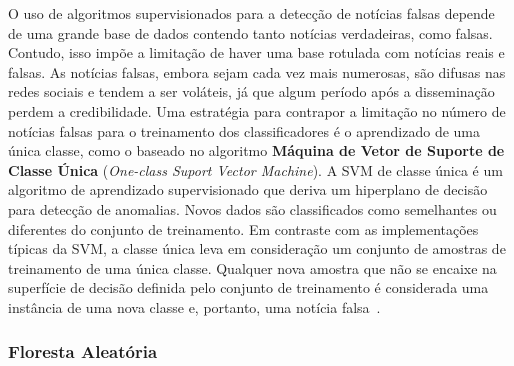 \documentclass{SBCbookchapter}
\begin{document}
O uso de algoritmos supervisionados para a detecção de notícias falsas depende de uma grande base de dados contendo tanto notícias verdadeiras, como falsas. Contudo, isso impõe a limitação de haver uma base rotulada com notícias reais e falsas. As notícias falsas, embora sejam cada vez mais numerosas, são difusas nas redes sociais e tendem a ser voláteis, já que algum período após a disseminação perdem a credibilidade. Uma estratégia para contrapor a limitação no número de notícias falsas para o treinamento dos classificadores é o aprendizado de uma única classe, como o baseado no algoritmo \textbf{Máquina de Vetor de Suporte de Classe
Única} (\textit{One-class Suport Vector Machine}). A SVM de classe única é um algoritmo de aprendizado supervisionado que deriva um hiperplano de decisão para detecção de anomalias. Novos dados são classificados como semelhantes ou diferentes do conjunto de treinamento. Em contraste com as implementações típicas da SVM, a classe única leva em consideração um conjunto de amostras de treinamento de uma única classe. Qualquer nova amostra que não se encaixe na superfície de decisão definida pelo conjunto de treinamento é considerada uma instância de uma nova classe e, portanto, uma notícia falsa~\cite{perdisci2006using,detection2019gaonkar}.


\subsubsection{Floresta Aleatória}
\label{subsubsec:floresta}
\end{document}
